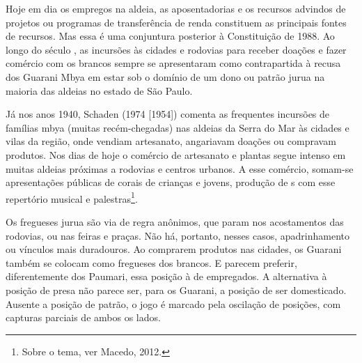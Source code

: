 Hoje em dia os empregos na aldeia, as aposentadorias e os recursos
advindos de projetos ou programas de transferência de renda constituem
as principais fontes de recursos. Mas essa é uma conjuntura posterior à
Constituição de 1988. Ao longo do século , as incursões às cidades e
rodovias para receber doações e fazer comércio com os brancos sempre se
apresentaram como contrapartida à recusa dos Guarani Mbya em estar sob
o domínio de um dono ou patrão jurua na maioria das aldeias no estado
de São Paulo. 

Já nos anos 1940, Schaden (1974 [1954]) comenta as frequentes incursões
de famílias mbya (muitas recém-chegadas) nas aldeias da Serra do Mar às
cidades e vilas da região, onde vendiam artesanato, angariavam doações
ou compravam produtos. Nos dias de hoje o comércio de artesanato e
plantas segue intenso em muitas aldeias próximas a rodovias e centros
urbanos. A esse comércio, somam-se apresentações públicas de corais de
crianças e jovens, produção de s com esse repertório musical e
palestras\footnote{Sobre o tema, ver Macedo, 2012.}. 

Os fregueses jurua são via de regra anônimos, que param nos acostamentos
das rodovias, ou nas feiras e praças. Não há, portanto, nesses casos,
apadrinhamento ou vínculos mais duradouros. Ao comprarem produtos nas
cidades, os Guarani também se colocam como fregueses dos brancos. E
parecem preferir, diferentemente dos Paumari, essa posição à de
empregados. A alternativa à posição de presa não parece ser, para os
Guarani, a posição de ser domesticado. Ausente a posição de patrão, o
jogo é marcado pela oscilação de posições, com capturas parciais de
ambos os lados.

